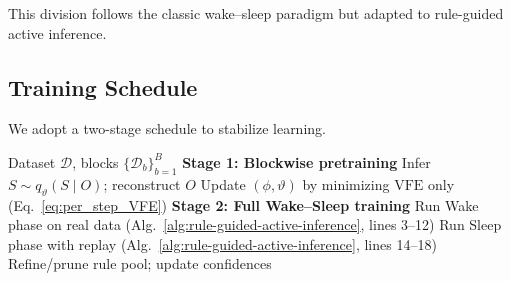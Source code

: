 \documentclass{article} %
\begin{document}
This division follows the classic wake–sleep paradigm \citep{hinton1995wake,friston2015active} but adapted to rule-guided active inference.


\subsection{Training Schedule}
We adopt a two-stage schedule to stabilize learning.  
\begin{algorithm}[ht]
\caption{Two-Stage Training: Blockwise Pretraining and Full Wake–Sleep}
\label{alg:training-schedule}
\begin{algorithmic}[1]
\Require Dataset $\mathcal D$, blocks $\{\mathcal D_b\}_{b=1}^B$
\State \textbf{Stage 1: Blockwise pretraining}
    \State Infer $S\sim q_{\vartheta}(S\mid O)$; reconstruct $O$
    \State Update $(\phi,\vartheta)$ by minimizing $\mathrm{VFE}$ only (Eq.~\ref{eq:per_step_VFE})
  \EndFor
\EndFor
\State \textbf{Stage 2: Full Wake–Sleep training}
  \State Run Wake phase on real data (Alg.~\ref{alg:rule-guided-active-inference}, lines 3--12)
  \State Run Sleep phase with replay (Alg.~\ref{alg:rule-guided-active-inference}, lines 14--18)
  \State Refine/prune rule pool; update confidences
\EndFor
\end{algorithmic}
\end{algorithm}
\end{document}

